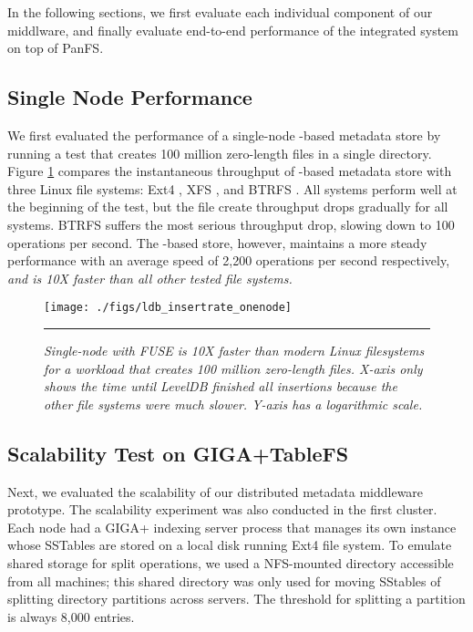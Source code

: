 In the following sections, we first evaluate each individual component
of our middlware, and finally evaluate end-to-end performance of
the integrated system on top of PanFS.

\subsection{Single Node Performance}
We first evaluated the performance of a single-node \ldb-based metadata store
by running a test that creates 100 million zero-length files in a single
directory.
Figure \ref{graph:ldb-singlenode} compares the instantaneous throughput of \ldb-based metadata 
store with three Linux file systems: Ext4 \cite{Ext4}, XFS \cite{XFS}, and
BTRFS \cite{BTRFS}.
All systems perform well at the beginning of the test, but the file create
throughput drops gradually for all systems. 
BTRFS suffers the most serious throughput drop, slowing down to 100 operations 
per second. 
The \ldb-based store, however, maintains a more steady performance 
with an average speed of 2,200 operations per second respectively,
\textit{and is 10X faster than all other tested file systems.}

\begin{figure}[t]  %
\centerline{\texttt{[image: ./figs/ldb\_insertrate\_onenode]}}
\vspace{10pt}
\caption{\normalsize
\textit{Single-node \tfs with FUSE is 10X faster than modern Linux
filesystems for a workload that creates 100 million zero-length files.
X-axis only shows the time until LevelDB finished all insertions because the other 
file systems were much slower. Y-axis has a logarithmic scale.}
}
\vspace{10pt}
\hrule 
\label{graph:ldb-singlenode}
\end{figure}       %



\subsection{Scalability Test on GIGA+TableFS}
Next, we evaluated the scalability of our distributed metadata middleware prototype.
The scalability experiment was also conducted in the first cluster.
Each node had a GIGA+ indexing server process that manages its own \tfs
instance whose SSTables are stored on a local disk running Ext4 file system.
To emulate shared storage for split operations,
we used a NFS-mounted directory accessible from all machines;
this shared directory was only used for moving SStables of
splitting directory partitions across servers.
The threshold for splitting a partition is always 8,000 entries.

